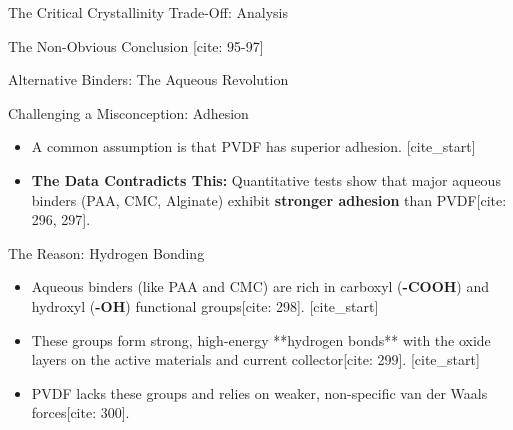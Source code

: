 \documentclass[aspectratio=169]{beamer}
\begin{document}
\begin{frame}{The Critical Crystallinity Trade-Off: Analysis}
\begin{alertblock}{The Non-Obvious Conclusion [cite: 95-97]}
\begin{frame}{Alternative Binders: The Aqueous Revolution}
    \begin{block}{Challenging a Misconception: Adhesion}
        \begin{itemize}
            \item A common assumption is that PVDF has superior adhesion.
            [cite_start]\item \textbf{The Data Contradicts This:} Quantitative tests show that major aqueous binders (PAA, CMC, Alginate) exhibit \textbf{stronger adhesion} than PVDF[cite: 296, 297].
        \end{itemize}
    \end{block}
    
    \begin{exampleblock}{The Reason: Hydrogen Bonding}
        \begin{itemize}
            [cite_start]\item Aqueous binders (like PAA and CMC) are rich in carboxyl (\textbf{-COOH}) and hydroxyl (\textbf{-OH}) functional groups[cite: 298].
            [cite_start]\item These groups form strong, high-energy **hydrogen bonds** with the oxide layers on the active materials and current collector[cite: 299].
            [cite_start]\item PVDF lacks these groups and relies on weaker, non-specific van der Waals forces[cite: 300].
        \end{itemize}
    \end{exampleblock}
    
    \vfill
    
\end{frame}


\end{alertblock}
\end{frame}
\end{document}
